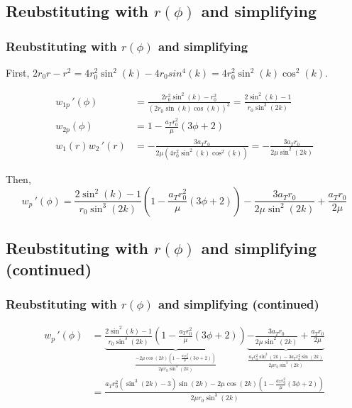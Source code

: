\documentclass{beamer}
\newcommand{\sectit}[1]{
    \section{\texorpdfstring{#1}{}}
    \frametitle{\texorpdfstring{#1}{}}
}
\begin{document}
\begin{frame}
    \sectit{Reubstituting with $r(\phi)$ and simplifying}

    First, $2r_0r-r^2=4r_0^2\sin^2(k)-4r_0sin^4(k)=4r_0^2\sin^2(k)\cos^2(k)$.

    {\begin{align}
        w_{1p}\,'(\phi)&=\frac{2r_0^2\sin^2(k)-r_0^2}{\left(2r_0\sin(k)\cos(k)\right)^3}=\frac{2\sin^2(k)-1}{r_0\sin^3(2k)}\\
        w_{2p}(\phi)&=1-\frac{a_Tr_0^2}{\mu}(3\phi+2)\\
        w_1(r)w_2\,'(r)&=-\frac{3a_Tr_0}{2\mu(4r_0^2\sin^2(k)\cos^2(k))}=-\frac{3a_Tr_0}{2\mu\sin^2(2k)}
    \end{align}}

    Then, 
    {\footnotesize\begin{equation}
        w_p\,'(\phi)=\frac{2\sin^2(k)-1}{r_0\sin^3(2k)}\left(1-\frac{a_Tr_0^2}{\mu}(3\phi+2)\right)-\frac{3a_Tr_0}{2\mu\sin^2(2k)}+\frac{a_Tr_0}{2\mu}
    \end{equation}}

\end{frame}

\begin{frame}
    \sectit{Reubstituting with $r(\phi)$ and simplifying (continued)}

    {\footnotesize\begin{align}
        w_p\,'(\phi)&=\underbrace{\frac{2\sin^2(k)-1}{r_0\sin^3(2k)}\left(1-\frac{a_Tr_0^2}{\mu}(3\phi+2)\right)}_{\frac{-2\mu\cos(2k)\left(1-\frac{a_Tr_0^2}{\mu}(3\phi+2)\right)}{2\mu r_0\sin^3(2k)}}\underbrace{-\frac{3a_Tr_0}{2\mu\sin^2(2k)}+\frac{a_Tr_0}{2\mu}}_{\frac{a_Tr_0^2\sin^3(2k)-3a_Tr_0^2\sin(2k)}{2\mu r_0\sin^3(2k)}}\\
        &=\frac{a_Tr_0^2\left(\sin^3(2k)-3\right)\sin(2k)-2\mu\cos(2k)\left(1-\frac{a_Tr_0^2}{\mu}(3\phi+2)\right)}{2\mu r_0\sin^3(2k)}
    \end{align}}
\end{frame}
\end{document}
